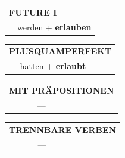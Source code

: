 \documentclass[10pt,a4paper]{revtex4-2}
\begin{document}
\begin{verbbox-acc}
\begin{tabular}{rl}
    \multicolumn{2}{l}{\textbf{FUTURE I} }\\
  &  werden + \textbf{erlauben}\\
 
  \end{tabular}
\hfill
   \begin{tabular}{rl}
      \multicolumn{2}{l}{\textbf{PLUSQUAMPERFEKT}}\\
  &  hatten + \textbf{erlaubt}\\
  \end{tabular}
  
  \vspace{10pt}

\begin{tabular}{lll}
\multicolumn{3}{l}{\textbf{MIT PRÄPOSITIONEN}}\\
& ---\\
\end{tabular}
\hfill
\begin{tabular}{lll}
\multicolumn{3}{l}{\textbf{TRENNBARE VERBEN}}\\
& ---\\
\end{tabular}

  \vspace{-5pt}


\end{verbbox-acc}
\end{document}
